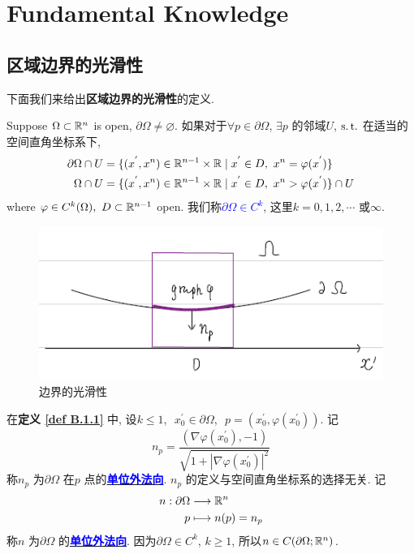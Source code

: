 \chapter{Fundamental Knowledge}\label{appendix B}

\section{区域边界的光滑性}
	下面我们来给出\textbf{区域边界的光滑性}的定义.

	\begin{defn}\label{def B.1.1}
		Suppose $\Omega \subset \mathbb{R}^n$ is open, $\partial \Omega \neq \varnothing$. 如果对于$\forall p \in \partial \Omega$, $\exists p$ 的邻域$U$, $\operatorname{s.t.}$ 在适当的空间直角坐标系下, 
		\begin{align}
			\partial \Omega \cap U &= \{ (x^{'} , x^{n}) \in \mathbb{R}^{n - 1} \times \mathbb{R} \mid x^{'} \in D , \,\, x^n = \varphi(x^{'}) \} \\
			\Omega \cap U &= \{ (x^{'} , x^n) \in \mathbb{R}^{n - 1} \times \mathbb{R} \mid x^{'} \in D , \,\, x^n > \varphi(x^{'}) 	\} \cap U
		\end{align}
		where $\varphi \in C^{k}(\Omega) , \,\, D \subset \mathbb{R}^{n - 1}$ open. 我们称\underline{\textcolor{blue}{\textbf{$\partial \Omega \in C^k$}}}, 这里$k = 0 , 1 , 2 , \cdots$ 或$\infty$.
	
		\begin{figure}[thbp!]
			\centering
			\includegraphics[width=0.5\linewidth]{figure/A.1-1}
			\caption{边界的光滑性}
			\label{pic : A.1-1} %
		\end{figure}
	
		\begin{rmk}
			在\textbf{定义 \ref{def B.1.1}} 中, 设$k \leq 1$, $\,\, x_{0}^{'} \in \partial \Omega$, $\,\, p = (x_{0}^{'} , \varphi(x_{0}^{'}))$. 记
			\[ n_p = \frac{(\nabla \varphi(x_{0}^{'}) , -1)}{\sqrt{1 + \left| \nabla \varphi(x_{0}^{'}) \right|^2}} \]
			称$n_p$ 为$\partial \Omega$ 在$p$ 点的\underline{\textcolor{blue}{\textbf{单位外法向}}}. $n_p$ 的定义与空间直角坐标系的选择无关. 记
			\begin{align}
				n : \partial \Omega &\longrightarrow \mathbb{R}^n \\
				p &\longmapsto n(p) = n_p 
			\end{align}
			称$n$ 为$\partial \Omega$ 的\underline{\textcolor{blue}{\textbf{单位外法向}}}. 因为$\partial \Omega \in C^k$, $k \geq 1$, 所以$n \in C(\partial \Omega ; \mathbb{R}^n)$.
		\end{rmk}
	\end{defn}

